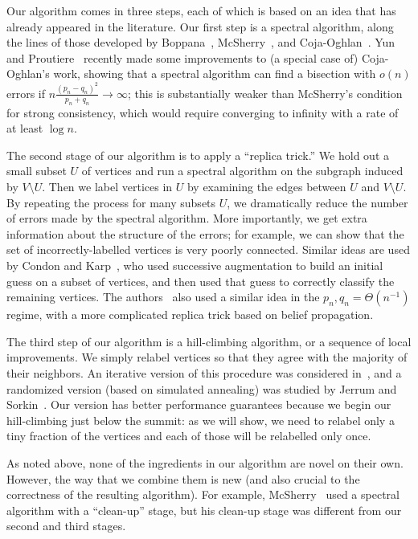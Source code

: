 \documentclass[EJP,final]{ejpecp}
\newcommand{\1}[1]{\mathbbm{1}_{\{#1\}}}
\begin{document}
Our algorithm comes in three steps, each of which is based on an idea that has already
appeared in the literature. Our first step is a spectral algorithm, along the lines of those
developed by Boppana~\cite{B:87}, McSherry~\cite{M:01}, and Coja-Oghlan~\cite{CO:10}.
Yun and Proutiere~\cite{YunProutiere:14} recently made some improvements to (a special case of) Coja-Oghlan's work,
showing that a spectral algorithm can find a bisection with $o(n)$ errors
if $n \frac{(p_n - q_n)^2}{p_n + q_n} \to \infty$; this is substantially weaker than McSherry's condition for strong consistency, which would
require converging to infinity with a rate of at least $\log n$.

The second stage of our algorithm is to apply a ``replica trick.'' We hold out a small subset $U$ of vertices
and run a spectral algorithm on the subgraph induced by $V \setminus U$. Then we label vertices in $U$ by examining
the edges between $U$ and $V \setminus U$. By repeating the process for many subsets $U$, we dramatically
reduce the number of errors made by the spectral algorithm. More importantly, we get extra information
about the structure of the errors; for example, we can show that the set of incorrectly-labelled vertices
is very poorly connected. Similar ideas are used by Condon and Karp~\cite{CK:01}, who used successive augmentation
to build an initial guess on a subset of vertices, and then used that guess to correctly classify the
remaining vertices. The authors~\cite{MoNeSl:14b} also used a similar idea in the $p_n, q_n = \Theta(n^{-1})$
regime, with a more complicated replica trick based on belief propagation.

The third step of our algorithm is a hill-climbing algorithm, or a sequence of local improvements.
We simply relabel vertices so that they agree with the majority of their neighbors.
An iterative version of this procedure was
considered in~\cite{CI:01}, and a randomized version (based on simulated annealing) was studied by
Jerrum and Sorkin~\cite{JS:98}. Our version has better performance guarantees because we
begin our hill-climbing just below the summit: as we will show, we need to relabel only a tiny fraction
of the vertices and each of those will be relabelled only once.

As noted above, none of the ingredients in our algorithm are novel on their own. However,
the way that we combine them is new (and also crucial to the correctness
of the resulting algorithm). For example, McSherry~\cite{M:01} used a spectral
algorithm with a ``clean-up'' stage, but his clean-up stage was different from our
second and third stages.
\end{document}
